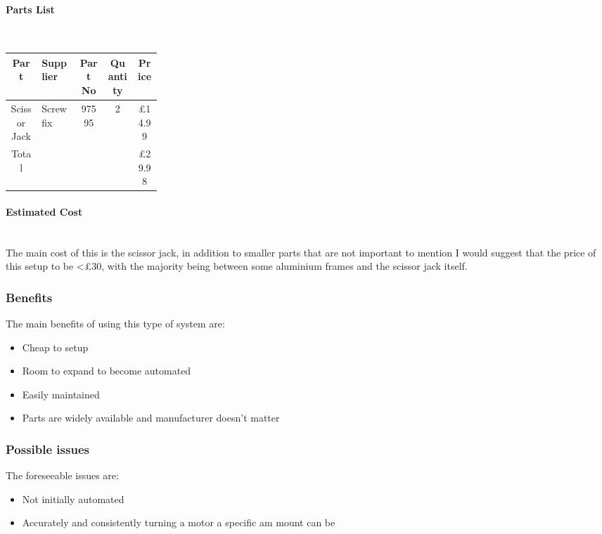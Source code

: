 \documentclass[11pt]{article}
\begin{document}
\paragraph{Parts List}\mbox{}\\

\begin{center}
  \begin{longtable}{||c |  p{0.25\linewidth}   |c | c | c||} 
    \hline
    Part & Supplier & Part No & Quantity & Price \\ [0.5ex] 
    \hline\hline
    Scissor Jack & Screwfix & 97595 & 2 & \pounds14.99 \\ 
    \hline
    \hline
    Total & & & & \pounds29.98 \\
    \hline
  \end{longtable}
\end{center}

\paragraph{Estimated Cost}\mbox{}\\
The main cost of this is the scissor jack, in addition to smaller parts that are not important to mention I would suggest
that the price of this setup to be <\pounds30, with the majority being between some aluminium frames and the scissor jack itself. 
\subsubsection{Benefits}

The main benefits of using this type of system are:
\begin{itemize}
  \item Cheap to setup
  \item Room to expand to become automated
  \item Easily maintained
  \item Parts are widely available and manufacturer doesn't matter 
\end{itemize}

\subsubsection{Possible issues}

The foreseeable issues are:  
\begin{itemize}
  \item Not initially automated
  \item Accurately and consistently turning a motor a specific am mount can be  
  
\end{itemize}
\end{document}
